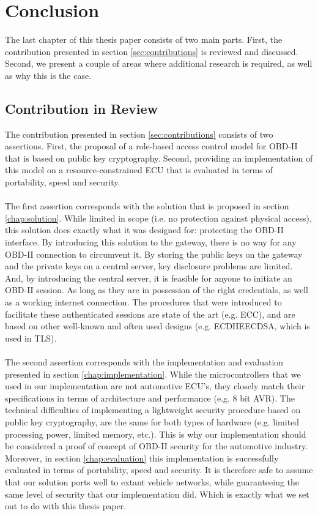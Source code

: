 
\chapter{Conclusion}
The last chapter of this thesis paper consists of two main parts. First, the contribution presented in section \ref{sec:contributions} is reviewed and discussed. Second, we present a couple of areas where additional research is required, as well as why this is the case.

\section{Contribution in Review}
The contribution presented in section \ref{sec:contributions} consists of two assertions. First, the proposal of a role-based access control model for OBD-II that is based on public key cryptography. Second, providing an implementation of this model on a resource-constrained ECU that is evaluated in terms of portability, speed and security. \\ \\ The first assertion corresponds with the solution that is proposed in section \ref{chap:solution}. While limited in scope (i.e. no protection against physical access), this solution does exactly what it was designed for: protecting the OBD-II interface. By introducing this solution to the gateway, there is no way for any OBD-II connection to circumvent it. By storing the public keys on the gateway and the private keys on a central server, key disclosure problems are limited. And, by introducing the central server, it is feasible for anyone to initiate an OBD-II session. As long as they are in possession of the right credentials, as well as a working internet connection. The procedures that were introduced to facilitate these authenticated sessions are state of the art (e.g. ECC), and are based on other well-known and often used designs (e.g. ECDHE\textunderscore ECDSA, which is used in TLS). \\ \\ The second assertion corresponds with the implementation and evaluation presented in section \ref{chap:implementation}. While the microcontrollers that we used in our implementation are not automotive ECU's, they closely match their specifications in terms of architecture and performance (e.g. 8 bit AVR). The technical difficulties of implementing a lightweight security procedure based on public key cryptography, are the same for both types of hardware (e.g. limited processing power, limited memory, etc.). This is why our implementation should be considered a proof of concept of OBD-II security for the automotive industry. Moreover, in section \ref{chap:evaluation} this implementation is successfully evaluated in terms of portability, speed and security. It is therefore safe to assume that our solution ports well to extant vehicle networks, while guaranteeing the same level of security that our implementation did. Which is exactly what we set out to do with this thesis paper.

